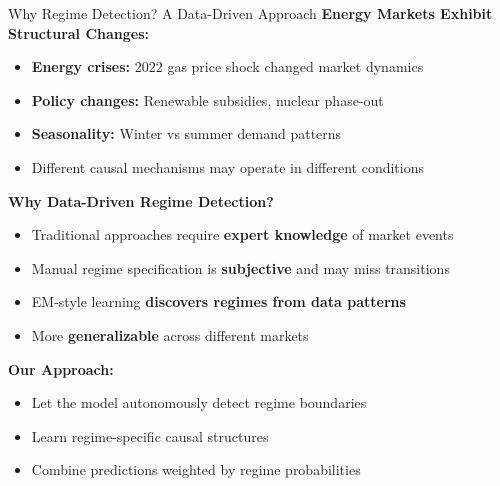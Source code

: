 \documentclass[aspectratio=169]{beamer}
\begin{document}
\begin{frame}{Why Regime Detection? A Data-Driven Approach}
\textbf{Energy Markets Exhibit Structural Changes:}
\begin{itemize}
    \item \textbf{Energy crises:} 2022 gas price shock changed market dynamics
    \item \textbf{Policy changes:} Renewable subsidies, nuclear phase-out
    \item \textbf{Seasonality:} Winter vs summer demand patterns
    \item Different causal mechanisms may operate in different conditions
\end{itemize}

\vspace{0.3cm}
\textbf{Why Data-Driven Regime Detection?}
\begin{itemize}
    \item Traditional approaches require \textbf{expert knowledge} of market events
    \item Manual regime specification is \textbf{subjective} and may miss transitions
    \item EM-style learning \textbf{discovers regimes from data patterns}
    \item More \textbf{generalizable} across different markets
\end{itemize}

\vspace{0.3cm}
\textbf{Our Approach:}
\begin{itemize}
    \item Let the model autonomously detect regime boundaries
    \item Learn regime-specific causal structures
    \item Combine predictions weighted by regime probabilities
\end{itemize}
\end{frame}
\end{document}
